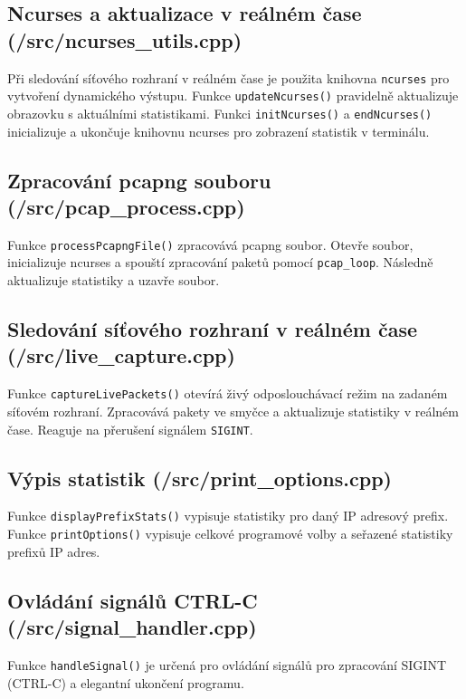 \documentclass[a4paper, 11pt]{article}
\begin{document}
    \subsection{Ncurses a aktualizace v reálném čase (/src/ncurses\_utils.cpp)}

    Při sledování síťového rozhraní v reálném čase je použita knihovna \texttt{ncurses} pro vytvoření dynamického výstupu. Funkce \texttt{updateNcurses()} pravidelně aktualizuje obrazovku s aktuálními statistikami. Funkci \texttt{initNcurses()} a \texttt{endNcurses()} inicializuje a ukončuje knihovnu ncurses pro zobrazení statistik v terminálu.

    \subsection{Zpracování pcapng souboru (/src/pcap\_process.cpp)}

    Funkce \texttt{processPcapngFile()} zpracovává pcapng soubor. Otevře soubor, inicializuje ncurses a spouští zpracování paketů pomocí \texttt{pcap\_loop}. Následně aktualizuje statistiky a uzavře soubor.

    \subsection{Sledování síťového rozhraní v reálném čase (/src/live\_capture.cpp)}

    Funkce \texttt{captureLivePackets()} otevírá živý odposlouchávací režim na zadaném síťovém rozhraní. Zpracovává pakety ve smyčce a aktualizuje statistiky v reálném čase. Reaguje na přerušení signálem \texttt{SIGINT}.

    \subsection{Výpis statistik (/src/print\_options.cpp)}

    Funkce \texttt{displayPrefixStats()} vypisuje statistiky pro daný IP adresový prefix.
    Funkce \texttt{printOptions()} vypisuje celkové programové volby a seřazené statistiky prefixů IP adres.

    \subsection{Ovládání signálů CTRL-C (/src/signal\_handler.cpp)}

    Funkce \texttt{handleSignal()} je určená pro ovládání signálů pro zpracování SIGINT (CTRL-C) a elegantní ukončení programu.
\end{document}

